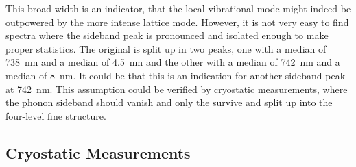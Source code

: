		This broad width is an indicator, that the local vibrational mode might indeed be outpowered by the more intense lattice mode.
		However, it is not very easy to find spectra where the sideband peak is pronounced and isolated enough to make proper statistics.
		The original \ZPL is split up in two peaks, one with a median \cwl of \SI{738}{nm} and a median \lw of \SI{4.5}{nm} and the other with a median \cwl of \SI{742}{nm} and a median \lw of \SI{8}{nm}.
		It could be that this is an indication for another sideband peak at \SI{742}{nm}.
		This assumption could be verified by cryostatic measurements, where the phonon sideband should vanish and only the \ZPL survive and split up into the four-level fine structure.
		\\
		\begin{figure}[tp]
			\begin{subfigure}[t]{ 0.49\linewidth}
				\centering
				\caption{}
				\label{subfig::sb_multfit_pos}
			\end{subfigure}
			\hfill
			\begin{subfigure}[t]{ 0.49\linewidth}
				\centering
				\caption{}
				\label{subfig::sb_multfit_width}
			\end{subfigure}
			\caption{}
			\label{fig::sideband_multfit}
		\end{figure}
		

	\subsection{Cryostatic Measurements}\label{subsec::cryo}

		\begin{figure}[tp]
			\begin{subfigure}[t]{ 0.49\linewidth}
				\centering
				\caption{}
				\label{subfig::roomtep1}
			\end{subfigure}
			\hfill
			\begin{subfigure}[t]{ 0.49\linewidth}
				\centering
				\caption{}
				\label{subfig::cryo}
			\end{subfigure}
			\caption{}
			\label{fig::rt_vs_cryo1}
		\end{figure}

